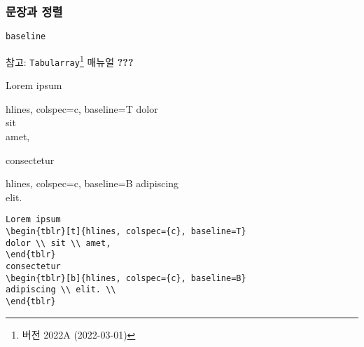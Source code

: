 \documentclass{beamer}
\newcommand*{\manual}[1]{\texttt{Tabularray}\footnote[2]{버전 2022A (2022-03-01)} 매뉴얼 \textbf{#1}}
\begin{document}
\begin{frame}
  \frametitle{문장과 정렬}
  \verb/baseline/

  참고: \manual{???}

  \begin{center}
    Lorem ipsum
    \begin{tblr}[t]{hlines, colspec={c}, baseline=T}
    dolor \\ sit \\ amet,
    \end{tblr}
    consectetur
    \begin{tblr}[b]{hlines, colspec={c}, baseline=B}
    adipiscing \\ elit. \\
    \end{tblr}
  \end{center}

  \framebreak
  \begin{lstlisting}
Lorem ipsum
\begin{tblr}[t]{hlines, colspec={c}, baseline=T}
dolor \\ sit \\ amet,
\end{tblr}
consectetur
\begin{tblr}[b]{hlines, colspec={c}, baseline=B}
adipiscing \\ elit. \\
\end{tblr}
  \end{lstlisting}
\end{frame}
\end{document}
